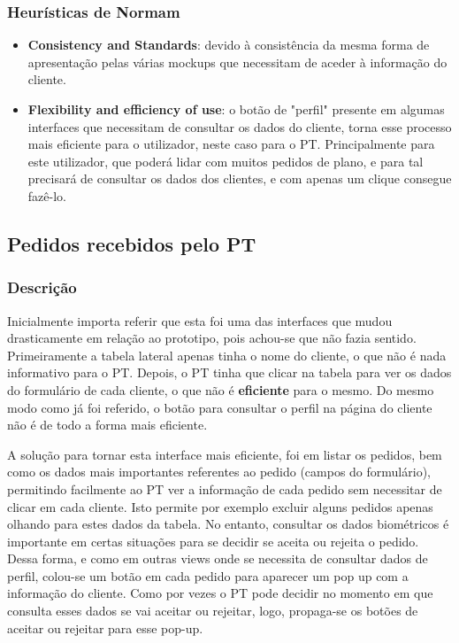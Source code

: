 \subsubsection{Heurísticas de Normam}
\begin{itemize}
    \item \textbf{Consistency and Standards}: devido à consistência da mesma forma de apresentação pelas várias mockups que necessitam de aceder à informação do cliente.
    \item \textbf{Flexibility and efficiency of use}: o botão de "perfil" presente em algumas interfaces que necessitam de consultar os dados do cliente, torna esse processo mais eficiente para o utilizador, neste caso para o PT. Principalmente para este utilizador, que poderá lidar com muitos pedidos de plano, e para tal precisará de consultar os dados dos clientes, e com apenas um clique consegue fazê-lo.
\end{itemize}

\subsection{Pedidos recebidos pelo PT}
\label{subsec:pedidosclientes}

\subsubsection{Descrição}
\hspace{5mm} Inicialmente importa referir que esta foi uma das interfaces que mudou drasticamente em relação ao prototipo, pois achou-se que não fazia sentido. Primeiramente a tabela lateral apenas tinha o nome do cliente, o que não é nada informativo para o PT. Depois, o PT tinha que clicar na tabela para ver os dados do formulário de cada cliente, o que não é \textbf{eficiente} para o mesmo. Do mesmo modo como já foi referido, o botão para consultar o perfil na página do cliente não é de todo a forma mais eficiente. 

\hspace{5mm}A solução para tornar esta interface mais eficiente, foi em listar os pedidos, bem como os dados mais importantes referentes ao pedido (campos do formulário), permitindo facilmente ao PT ver a informação de cada pedido sem necessitar de clicar em cada cliente. Isto permite por exemplo excluir alguns pedidos apenas olhando para estes dados da tabela. No entanto, consultar os dados biométricos 
é importante em certas situações para se decidir se aceita ou rejeita o pedido. Dessa forma, e como em outras views onde se necessita de consultar dados de perfil, colou-se um botão em cada pedido para aparecer um pop up com a informação do cliente. Como por vezes o PT pode decidir no momento em que consulta esses dados se vai aceitar ou rejeitar, logo, propaga-se os botões de aceitar ou rejeitar para esse pop-up.

